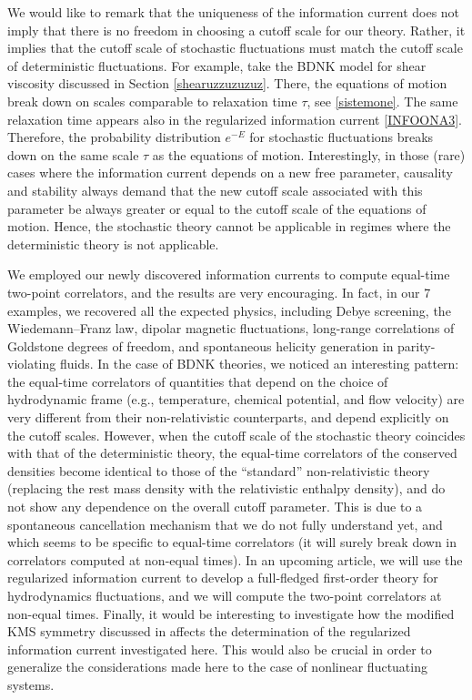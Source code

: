 \documentclass[a4paper, amsfonts, amssymb, amsmath, reprint, showkeys, nofootinbib, twoside,notitlepage,onecolumn,preprintnumbers]{revtex4-2}
\theoremstyle{definition}
\theoremstyle{theorem}
\theoremstyle{corollary}
\begin{document}
We would like to remark that the uniqueness of the information current does not imply that there is no freedom in choosing a cutoff scale for our theory. Rather, it implies that the cutoff scale of stochastic fluctuations must match the cutoff scale of deterministic fluctuations. For example, take the BDNK model for shear viscosity discussed in Section \ref{shearuzzuzuzuz}. There, the equations of motion break down on scales comparable to relaxation time $\tau$, see \eqref{sistemone}.  The same relaxation time appears also in the regularized information current \eqref{INFOONA3}. Therefore, the probability distribution $e^{-E}$ for stochastic fluctuations breaks down on the same scale $\tau$ as the equations of motion. Interestingly, in those (rare) cases where the information current depends on a new free parameter, causality and stability always demand that the new cutoff scale associated with this parameter be always greater or equal to the cutoff scale of the equations of motion. Hence, the stochastic theory cannot be applicable in regimes where the deterministic theory is not applicable.


We employed our newly discovered information currents to compute equal-time two-point correlators, and the results are very encouraging. In fact, in our 7 examples, we recovered all the expected physics, including Debye screening, the Wiedemann–Franz law, dipolar magnetic fluctuations, long-range correlations of Goldstone degrees of freedom, and spontaneous helicity generation in parity-violating fluids. In the case of BDNK theories, we noticed an interesting pattern: the equal-time correlators of quantities that depend on the choice of hydrodynamic frame (e.g., temperature, chemical potential, and flow velocity) are very different from their non-relativistic counterparts, and depend explicitly on the cutoff scales. However, when the cutoff scale of the stochastic theory coincides with that of the deterministic theory, the equal-time correlators of the conserved densities become identical to those of the ``standard'' non-relativistic theory \cite{landau9} (replacing the rest mass density with the relativistic enthalpy density), and do not show any dependence on the overall cutoff parameter. This is due to a spontaneous cancellation mechanism that we do not fully understand yet, and which seems to be specific to equal-time correlators (it will surely break down in correlators computed at non-equal times). In an upcoming article, we will use the regularized information current to develop a full-fledged first-order theory for hydrodynamics fluctuations, and we will compute the two-point correlators at non-equal times. Finally, it would be interesting to investigate how the modified KMS symmetry discussed in \cite{Mullins:2023ott} affects the determination of the regularized information current investigated here. This would also be crucial in order to generalize the considerations made here to the case of nonlinear fluctuating systems.  
\end{document}

